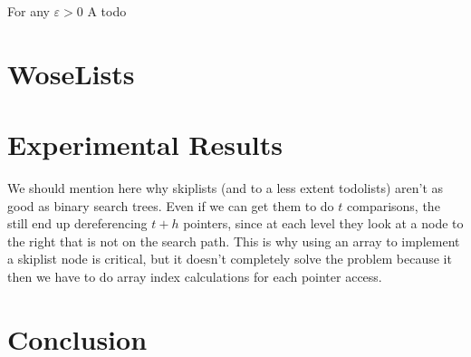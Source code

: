\documentclass[lotsofwhite]{patmorin}
\newcommand{\eps}{\varepsilon}
\begin{document}
\begin{thm}
For any $\eps >0$
A todo
\end{thm}


\section{WoseLists}


\section{Experimental Results}

We should mention here why skiplists (and to a less extent todolists)
aren't as good as binary search trees.  Even if we can get them to do $t$
comparisons, the still end up dereferencing $t+h$ pointers, since at each
level they look at a node to the right that is not on the search path.
This is why using an array to implement a skiplist node is critical,
but it doesn't completely solve the problem because it then we have to
do array index calculations for each pointer access.

\section{Conclusion}

%
%
%
%
%
%
\end{document}
